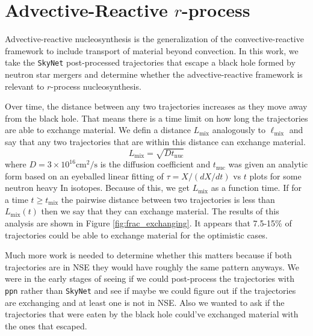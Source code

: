 \section{Advective-Reactive \texorpdfstring{$r$}{r}-process}\label{sec:ar_rprocess}


Advective-reactive nucleosynthesis is the generalization of the convective-reactive framework to include transport of material beyond convection.
In this work, we take the \texttt{SkyNet} post-processed trajectories  that escape a black hole formed by neutron star mergers and determine whether the advective-reactive framework is relevant to $r$-process nucleosynthesis.

Over time, the distance between any two trajectories increases as they move away from the black hole.
That means there is a time limit on how long the trajectories are able to exchange material.
We defin a distance $L_{\mathrm{mix}}$ analogously to $\ell_{\mathrm{mix}}$ and say that any two trajectories that are within this distance can exchange material.
\begin{equation}
    L_{\mathrm{mix}} = \sqrt{D t_{\mathrm{nuc}}}
\end{equation}
where $D=3\times10^16\mathrm{cm}^2/\mathrm{s}$ is the diffusion coefficient and $t_{\mathrm{nuc}}$ was given an analytic form based on an eyeballed linear fitting of  $\tau=X/(dX/dt)$ vs $t$ plots for some neutron heavy In isotopes.
Because of this, we get $L_{\mathrm{mix}}$ as a function time.
If for a time $t \geq t_{\mathrm{mix}}$ the pairwise distance between two trajectories is less than $L_{\mathrm{mix}}(t)$ then we say that they can exchange material. The results of this analysis are shown in Figure \ref{fig:frac_exchanging}.
It appears that 7.5-15\% of trajectories could be able to exchange material for the optimistic cases.

Much more work is needed to determine whether this matters because if both trajectories are in NSE they would have roughly the same pattern anyways.
We were in the early stages of seeing if we could post-process the trajectories with \texttt{ppn} rather than \texttt{SkyNet} and see if maybe we could figure out if the trajectories are exchanging and at least one is not in NSE.
Also we wanted to ask if the trajectories that were eaten by the black hole could've exchanged material with the ones that escaped.

